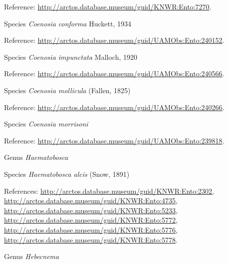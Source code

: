 \documentclass[9pt, article]{memoir}
\begin{document}
\begin{multicols}{2}
\vspace{6pt}Reference: 
\url{http://arctos.database.museum/guid/KNWR:Ento:7270}.

\vspace{6pt}\noindent\hspace{36pt}Species \textit{Coenosia conforma} Huckett, 1934


\vspace{6pt}Reference: 
\url{http://arctos.database.museum/guid/UAMObs:Ento:240152}.

\vspace{6pt}\noindent\hspace{36pt}Species \textit{Coenosia impunctata} Malloch, 1920


\vspace{6pt}Reference: 
\url{http://arctos.database.museum/guid/UAMObs:Ento:240566}.

\vspace{6pt}\noindent\hspace{36pt}Species \textit{Coenosia mollicula} (Fallen, 1825)


\vspace{6pt}Reference: 
\url{http://arctos.database.museum/guid/UAMObs:Ento:240266}.

\vspace{6pt}\noindent\hspace{36pt}Species \textit{Coenosia morrisoni}


\vspace{6pt}Reference: 
\url{http://arctos.database.museum/guid/UAMObs:Ento:239818}.

\vspace{6pt}\noindent\hspace{30pt}Genus \textit{Haematobosca}


\vspace{6pt}\noindent\hspace{36pt}Species \textit{Haematobosca alcis} (Snow, 1891)


\vspace{6pt}References: 
\url{http://arctos.database.museum/guid/KNWR:Ento:2302}, 
\url{http://arctos.database.museum/guid/KNWR:Ento:4735}, 
\url{http://arctos.database.museum/guid/KNWR:Ento:5233}, 
\url{http://arctos.database.museum/guid/KNWR:Ento:5772}, 
\url{http://arctos.database.museum/guid/KNWR:Ento:5776}, 
\url{http://arctos.database.museum/guid/KNWR:Ento:5778}.

\vspace{6pt}\noindent\hspace{30pt}Genus \textit{Hebecnema}



\end{multicols}
\end{document}
